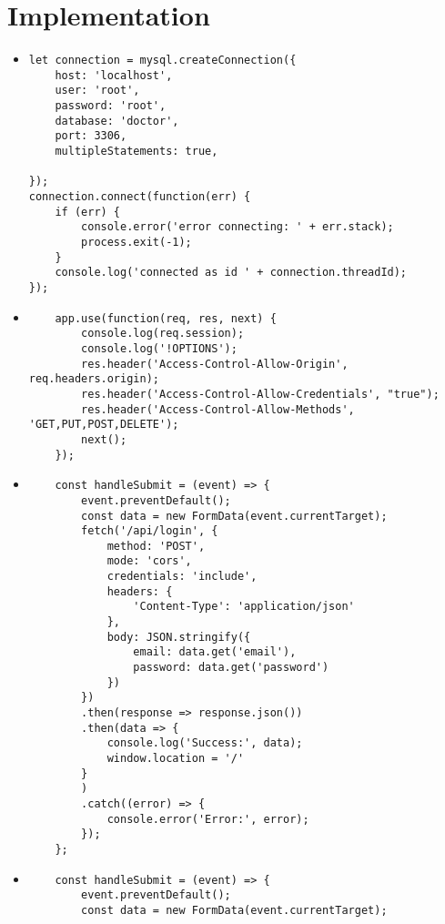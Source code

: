 \chapter{Implementation}
\begin{itemize}
    \item 
\begin{verbatim}
let connection = mysql.createConnection({
    host: 'localhost',
    user: 'root',
    password: 'root',
    database: 'doctor',
    port: 3306,
    multipleStatements: true,
    
});
connection.connect(function(err) {
    if (err) {
        console.error('error connecting: ' + err.stack);
        process.exit(-1);
    }
    console.log('connected as id ' + connection.threadId);
});
\end{verbatim}
    \item
    \begin{verbatim}
    app.use(function(req, res, next) {
        console.log(req.session);
        console.log('!OPTIONS');
        res.header('Access-Control-Allow-Origin', req.headers.origin);
        res.header('Access-Control-Allow-Credentials', "true");
        res.header('Access-Control-Allow-Methods', 'GET,PUT,POST,DELETE');
        next();
    });
    \end{verbatim}
    \item
    \begin{verbatim}
    const handleSubmit = (event) => {
        event.preventDefault();
        const data = new FormData(event.currentTarget);
        fetch('/api/login', {
            method: 'POST',
            mode: 'cors',
            credentials: 'include',
            headers: { 
                'Content-Type': 'application/json'
            },
            body: JSON.stringify({
                email: data.get('email'),
                password: data.get('password')
            })
        })
        .then(response => response.json())
        .then(data => {
            console.log('Success:', data);
            window.location = '/'
        }
        )
        .catch((error) => {
            console.error('Error:', error);
        });
    };
    \end{verbatim}
    \item
    \begin{verbatim}
    const handleSubmit = (event) => {
        event.preventDefault();
        const data = new FormData(event.currentTarget);

\end{verbatim}
\end{itemize}
